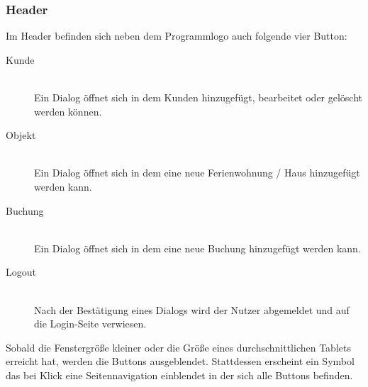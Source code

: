 \subsubsection{Header}
Im Header befinden sich neben dem Programmlogo auch folgende vier Button:


\begin{minipage}{0.6\textwidth}
\begin{description}
\item[Kunde]\hfill \\
Ein Dialog öffnet sich in dem Kunden hinzugefügt, bearbeitet oder gelöscht werden können.
\item[Objekt]\hfill \\
Ein Dialog öffnet sich in dem eine neue Ferienwohnung / Haus hinzugefügt werden kann.
\item[Buchung]\hfill \\
Ein Dialog öffnet sich in dem eine neue Buchung hinzugefügt werden kann.
\item[Logout]\hfill \\
Nach der Bestätigung eines Dialogs wird der Nutzer abgemeldet und auf die Login-Seite verwiesen.
\end{description}

Sobald die Fenstergröße kleiner oder die Größe eines durchschnittlichen Tablets erreicht hat, werden die Buttons ausgeblendet. Stattdessen erscheint ein Symbol das bei Klick eine Seitennavigation einblendet in der sich alle Buttons befinden.
\end{minipage}
\hspace{0.05\textwidth}
